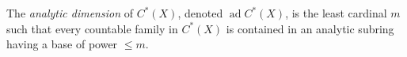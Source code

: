 The \textit{analytic dimension} of $C^*(X)$, denoted $\operatorname{ad} C^*(X)$, is the least cardinal $m$ such that every countable family in $C^*(X)$ is contained in an analytic subring having a base of power $\leq m$.
